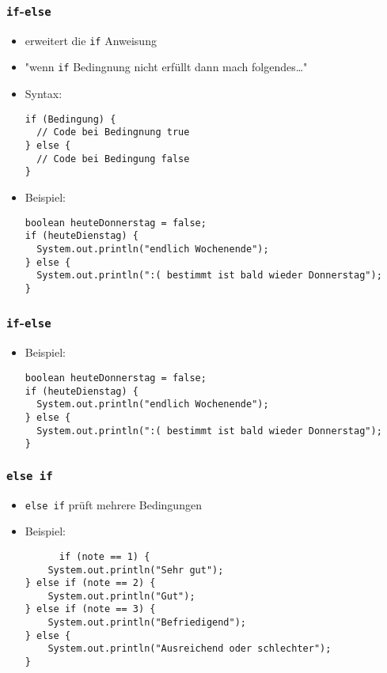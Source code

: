 \documentclass{../../presentation}
\begin{document}
\begin{frame}[fragile]
  \frametitle{\texttt{if}-\texttt{else}}

  \begin{itemize}
    \item<1-> erweitert die \texttt{if} Anweisung
    \item<1-> "wenn \texttt{if} Bedingnung nicht erfüllt dann mach folgendes\dots"
    \item<1-> Syntax:
\begin{verbatim}
if (Bedingung) {
  // Code bei Bedingnung true
} else {
  // Code bei Bedingung false
}
\end{verbatim}
    \item<2-> Beispiel:
\begin{verbatim}
boolean heuteDonnerstag = false;
if (heuteDienstag) {
  System.out.println("endlich Wochenende");
} else {
  System.out.println(":( bestimmt ist bald wieder Donnerstag");
}
\end{verbatim}
  \end{itemize}
\end{frame}

\begin{frame}[fragile]
    \frametitle{\texttt{if}-\texttt{else}}
    \begin{itemize}
            \item<1-> Beispiel:
\begin{verbatim}
boolean heuteDonnerstag = false;
if (heuteDienstag) {
  System.out.println("endlich Wochenende");
} else {
  System.out.println(":( bestimmt ist bald wieder Donnerstag");
}
\end{verbatim}
    \end{itemize}
\end{frame}

\begin{frame}[fragile]
  \frametitle{\texttt{else if}}
  \begin{itemize}
    \item \texttt{else if} prüft mehrere Bedingungen
    \item Beispiel:
    \begin{verbatim}
      if (note == 1) {
    System.out.println("Sehr gut");
} else if (note == 2) {
    System.out.println("Gut");
} else if (note == 3) {
    System.out.println("Befriedigend");
} else {
    System.out.println("Ausreichend oder schlechter");
} 
    \end{verbatim}
  \end{itemize}
\end{frame}
\end{document}

